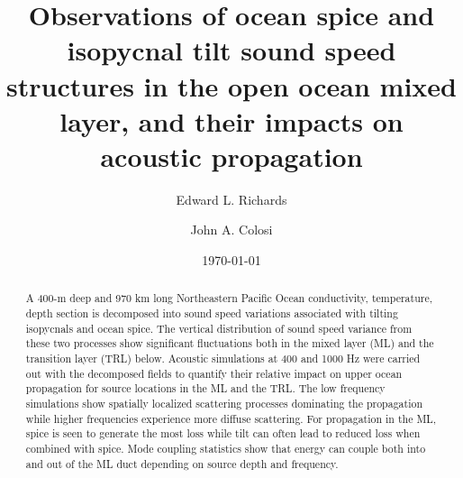 \documentclass[preprint,NumberedRefs]{JASA}
\begin{document}
\title[Mixed layer tilt and spice]{Observations of ocean spice and isopycnal tilt sound speed structures in the open ocean mixed layer, and their impacts on acoustic propagation}
\author{Edward L. Richards}
\author{John A. Colosi}

\date{\today}

\begin{abstract}
A 400-m deep and 970 km long Northeastern Pacific Ocean conductivity, temperature, depth section is decomposed into sound speed variations associated with tilting isopycnals and ocean spice. The vertical distribution of sound speed variance from these two processes show significant fluctuations both in the mixed layer (ML) and the transition layer (TRL) below. Acoustic simulations at 400 and 1000 Hz were carried out with the decomposed fields to quantify their relative impact on upper ocean propagation for source locations in the ML and the TRL. The low frequency simulations show spatially localized scattering processes dominating the propagation while higher frequencies experience more diffuse scattering. For propagation in the ML, spice is seen to generate the most loss while tilt can often lead to reduced loss when combined with spice. Mode coupling statistics show that energy can couple both into and out of the ML duct depending on source depth and frequency.
\end{abstract}

\maketitle
\end{document}

